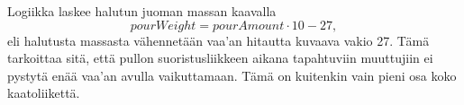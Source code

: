 Logiikka laskee halutun juoman massan kaavalla
\[pourWeight = pourAmount \cdot 10  - 27, \]
eli halutusta massasta vähennetään vaa'an hitautta kuvaava vakio 27. Tämä tarkoittaa sitä, että pullon suoristusliikkeen aikana tapahtuviin muuttujiin ei pystytä enää vaa'an avulla vaikuttamaan. Tämä on kuitenkin vain pieni osa koko kaatoliikettä.
